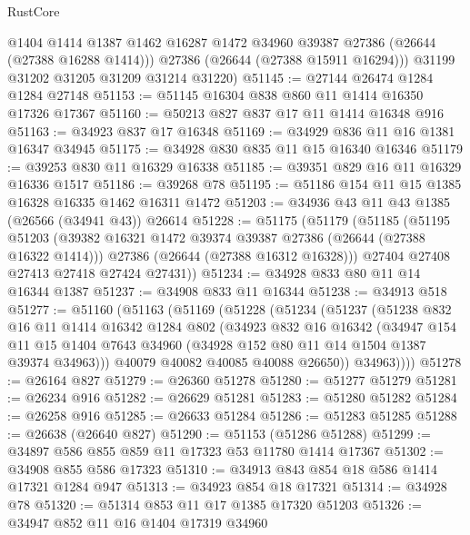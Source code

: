 \begin{lexlean}{RustCore}
\begin{coremodule}
          @1404
          @1414
          @1387
          @1462
          @16287
          @1472
          @34960
          @39387
          @27386
          (@26644 (@27388 @16288 @1414)))
        @27386
        (@26644 (@27388 @15911 @16294)))
      @31199
      @31202
      @31205
      @31209
      @31214
      @31220)
@51145 := @27144 @26474 @1284 @1284 @27148
@51153 := @51145 @16304 @838 @860 @11 @1414 @16350 @17326 @17367
@51160 := @50213 @827 @837 @17 @11 @1414 @16348 @916
@51163 := @34923 @837 @17 @16348
@51169 := @34929 @836 @11 @16 @1381 @16347 @34945
@51175 := @34928 @830 @835 @11 @15 @16340 @16346
@51179 := @39253 @830 @11 @16329 @16338
@51185 := @39351 @829 @16 @11 @16329 @16336 @1517
@51186 := @39268 @78
@51195 := @51186 @154 @11 @15 @1385 @16328 @16335 @1462 @16311 @1472
@51203 := @34936 @43 @11 @43 @1385 (@26566 (@34941 @43)) @26614
@51228 := @51175
    (@51179
      (@51185
        (@51195
          @51203
          (@39382 @16321 @1472 @39374 @39387 @27386 (@26644 (@27388 @16322 @1414)))
          @27386
          (@26644 (@27388 @16312 @16328)))
        @27404
        @27408
        @27413
        @27418
        @27424
        @27431))
@51234 := @34928 @833 @80 @11 @14 @16344 @1387
@51237 := @34908 @833 @11 @16344
@51238 := @34913 @518
@51277 := @51160
    (@51163
      (@51169
        (@51228
          (@51234
            (@51237
              (@51238
                @832
                @16
                @11
                @1414
                @16342
                @1284
                @802
                (@34923
                  @832
                  @16
                  @16342
                  (@34947
                    @154
                    @11
                    @15
                    @1404
                    @7643
                    @34960
                    (@34928 @152 @80 @11 @14 @1504 @1387 @39374 @34963)))
                @40079
                @40082
                @40085
                @40088
                @26650))
            @34963))))
@51278 := @26164 @827
@51279 := @26360 @51278
@51280 := @51277 @51279
@51281 := @26234 @916
@51282 := @26629 @51281
@51283 := @51280 @51282
@51284 := @26258 @916
@51285 := @26633 @51284
@51286 := @51283 @51285
@51288 := @26638 (@26640 @827)
@51290 := @51153 (@51286 @51288)
@51299 := @34897 @586 @855 @859 @11 @17323 @53 @11780 @1414 @17367
@51302 := @34908 @855 @586 @17323
@51310 := @34913 @843 @854 @18 @586 @1414 @17321 @1284 @947
@51313 := @34923 @854 @18 @17321
@51314 := @34928 @78
@51320 := @51314 @853 @11 @17 @1385 @17320 @51203
@51326 := @34947 @852 @11 @16 @1404 @17319 @34960

\end{coremodule}
\end{lexlean}
